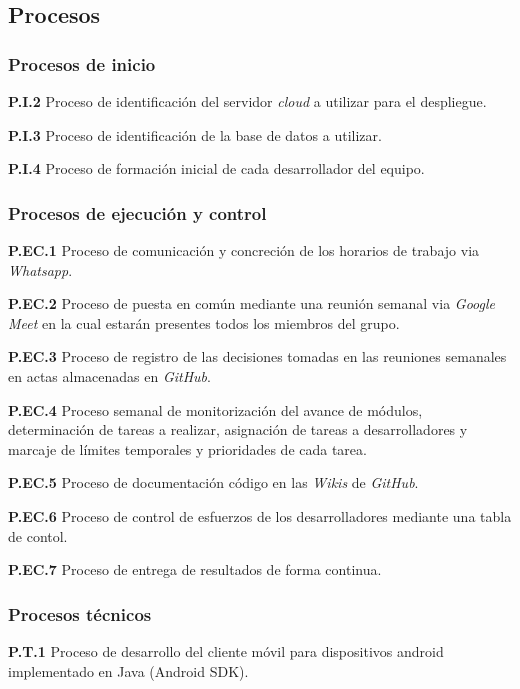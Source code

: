 \documentclass{article}
\begin{document}
\subsection{Procesos}

\subsubsection{Procesos de inicio}

\textbf{P.I.2} Proceso de identificación del servidor \textit{cloud} a utilizar para el despliegue.

\textbf{P.I.3} Proceso de identificación de la base de datos a utilizar.

\textbf{P.I.4} Proceso de formación inicial de cada desarrollador del equipo.

\subsubsection{Procesos de ejecución y control}

\textbf{P.EC.1} Proceso de comunicación y concreción de los horarios de trabajo via \textit{Whatsapp}.

\textbf{P.EC.2} Proceso de puesta en común mediante una reunión semanal via \textit{Google Meet} en la cual estarán presentes todos los miembros del grupo.

\textbf{P.EC.3} Proceso de registro de las decisiones tomadas en las reuniones semanales en actas almacenadas en \textit{GitHub}.

\textbf{P.EC.4} Proceso semanal de monitorización del avance de módulos, determinación de tareas a realizar, asignación de tareas a desarrolladores y marcaje de límites temporales y prioridades de cada tarea.

\textbf{P.EC.5} Proceso de documentación código en las \textit{Wikis} de \textit{GitHub}.

\textbf{P.EC.6} Proceso de control de esfuerzos de los desarrolladores mediante una tabla de contol.

\textbf{P.EC.7} Proceso de entrega de resultados de forma continua.

\subsubsection{Procesos técnicos}

\textbf{P.T.1} Proceso de desarrollo del cliente móvil para dispositivos android implementado en Java (Android SDK).
\end{document}
